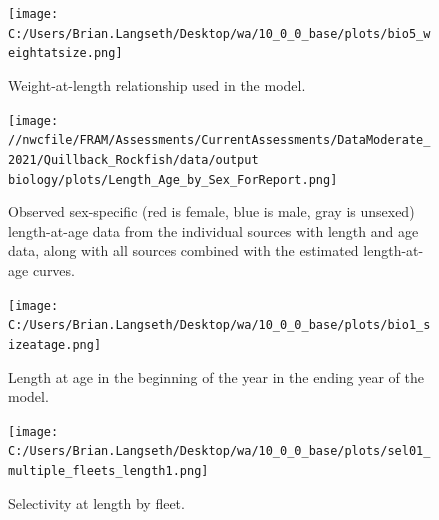 \documentclass[11pt,
  english,
  letterpaper,
]{article}
\begin{document}
\tagmcend\tagstructend


\begin{figure}
\centering
\texttt{[image: C:/Users/Brian.Langseth/Desktop/wa/10\_0\_0\_base/plots/bio5\_weightatsize.png]}
\caption{Weight-at-length relationship used in the model.\label{fig:len-weight}}
\end{figure}

\tagmcend\tagstructend


\begin{figure}
\centering
\texttt{[image: //nwcfile/FRAM/Assessments/CurrentAssessments/DataModerate\_2021/Quillback\_Rockfish/data/output biology/plots/Length\_Age\_by\_Sex\_ForReport.png]}
\caption{Observed sex-specific (red is female, blue is male, gray is unsexed) length-at-age data from the individual sources with length and age data, along with all sources combined with the estimated length-at-age curves.\label{fig:len-age-data}}
\end{figure}

\tagmcend\tagstructend


\begin{figure}
\centering
\texttt{[image: C:/Users/Brian.Langseth/Desktop/wa/10\_0\_0\_base/plots/bio1\_sizeatage.png]}
\caption{Length at age in the beginning of the year in the ending year of the model.\label{fig:len-age-ss}}
\end{figure}

\tagmcend\tagstructend


\begin{figure}
\centering
\texttt{[image: C:/Users/Brian.Langseth/Desktop/wa/10\_0\_0\_base/plots/sel01\_multiple\_fleets\_length1.png]}
\caption{Selectivity at length by fleet.\label{fig:selex}}
\end{figure}
\end{document}
